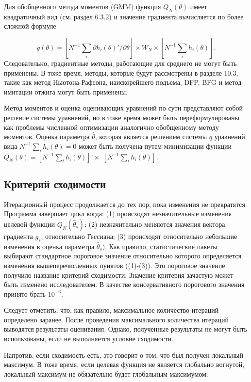 Для обобщенного метода моментов (GMM) функция $Q_N({\theta})$ имеет квадратичный вид (см. раздел 6.3.2) и значение градиента вычисляется по более сложной формуле

\[
g{(\theta)}=\left[N^{-1}\sum_{i}\partial{h_i}(\theta)'/\partial{\theta}\right] \times W_N \times \left[N^{-1}\sum_{i}h_{i}(\theta)\right].
\]
Следовательно, градиентные методы, работающие для среднего не могут быть применены. В тоже время, методы, которые будут рассмотрены в разделе 10.3, такие как метод Ньютона-Рафсона, наискорейшего подъема, DFP, BFG и метод имитации отжига могут быть применены.

Метод моментов и оценка оценивающих уравнений по сути представляют собой решение системы уравнений, но в тоже время может быть переформулированы как проблемы численной оптимизации аналогично обобщенному методу моментов. Оценка параметра $\hat{\theta}$, которая является решением системы $q$ уравнений вида $N^{-1}\sum_{i}h_{i}(\theta)=0$ может быть получена путем минимизации функции $Q_N(\theta)=[N^{-1}\sum_{i}h_{i}(\theta)]’\times$ $[N^{-1}\sum_{i}h_{i}(\theta)]$.

\subsection{Критерий сходимости}

Итерационный процесс продолжается до тех пор, пока изменения не прекратятся. Программа завершает цикл когда: (1) происходят незначительные изменения целевой функции $Q_N(\hat{\theta}_s)$; (2) незначительно меняются значения вектора градиента $g_s$, относительно Гессиана; (3) происходят относительно небольшие изменения в оценка параметра $\hat{\theta}_s)$. Как правило, статистические пакеты выбирают стандартное пороговое значение относительно которого определяется изменения вышеперечисленных пунктов ((1)-(3)). Это пороговое значение получило название критерий сходимости. Значение критерия зачастую может быть изменено исследователем. В качестве консервативного порогового значения  принято брать $10^{-6}$.

Следует отметить, что, как правило, максимальное количество итераций определено заранее. После проведения максимального количества итераций выводятся результаты оценивания. Однако, полученные результаты не могут быть использованы, если не выполняется условие сходимости.

Напротив, если сходимость есть, это говорит о том, что был получен локальный максимум. В тоже время, если целевая функция не является глобально вогнутой, локальный максимум не обязательно будет глобальным максимумом.

